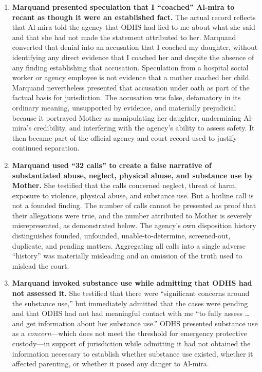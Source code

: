 \documentclass[10pt,a4paper,roman]{moderncv}
\begin{document}
\begin{enumerate}[label=\arabic*., leftmargin=0.5in, itemsep=0.85em]
		\item \textbf{Marquand presented speculation that I ``coached'' Al-mira to recant as though it were an established fact.} The actual record reflects that Al-mira told the agency that ODHS had lied to me about what she said and that she had not made the statement attributed to her. Marquand converted that denial into an accusation that I coached my daughter, without identifying any direct evidence that I coached her and despite the absence of any finding establishing that accusation. Speculation from a hospital social worker or agency employee is not evidence that a mother coached her child. Marquand nevertheless presented that accusation under oath as part of the factual basis for jurisdiction. The accusation was false, defamatory in its ordinary meaning, unsupported by evidence, and materially prejudicial because it portrayed Mother as manipulating her daughter, undermining Al-mira's credibility, and interfering with the agency's ability to assess safety. It then became part of the official agency and court record used to justify continued separation.
		
		\item \textbf{Marquand used ``32 calls'' to create a false narrative of substantiated abuse, neglect, physical abuse, and substance use by Mother.} She testified that the calls concerned neglect, threat of harm, exposure to violence, physical abuse, and substance use. But a hotline call is not a founded finding. The number of calls cannot be presented as proof that their allegations were true, and the number attributed to Mother is severely misrepresented, as demonstrated below. The agency's own disposition history distinguishes founded, unfounded, unable-to-determine, screened-out, duplicate, and pending matters. Aggregating all calls into a single adverse ``history'' was materially misleading and an omission of the truth used to mislead the court.
		
		\item \textbf{Marquand invoked substance use while admitting that ODHS had not assessed it.} She testified that there were ``significant concerns around the substance use,'' but immediately admitted that the cases were pending and that ODHS had not had meaningful contact with me ``to fully assess \ldots and get information about her substance use.'' ODHS presented substance use as a \emph{concern}---which does not meet the threshold for emergency protective custody---in support of jurisdiction while admitting it had not obtained the information necessary to establish whether substance use existed, whether it affected parenting, or whether it posed any danger to Al-mira.
		

\end{enumerate}
\end{document}
